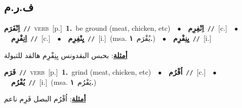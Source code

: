\documentclass[10pt,a4paper,twoside]{article} %
\begin{document}
\begin{multicols}{2}
\vspace{-3mm}
\subsection*{\color{blue}\foreignlanguage{arabic}{ف.ر.م}\color{blue}{}} 

{\setlength\topsep{0pt}\textbf{\foreignlanguage{arabic}{اِنْفَرَم}}\ {\color{gray}\texttt{//}\color{black}}\ \textsc{verb}\ [p.]\ \textbf{1.}~be ground (meat, chicken, etc)\ \ $\bullet$\ \ \setlength\topsep{0pt}\textbf{\foreignlanguage{arabic}{اِنْفِرِم}}\ {\color{gray}\texttt{//}\color{black}}\ [c.]\ \ $\bullet$\ \ \setlength\topsep{0pt}\textbf{\foreignlanguage{arabic}{اِنِفْرِم}}\ {\color{gray}\texttt{//}\color{black}}\ [c.]\ \ $\bullet$\ \ \setlength\topsep{0pt}\textbf{\foreignlanguage{arabic}{يِنْفِرِم}}\ {\color{gray}\texttt{//}\color{black}}\ [i.]\ \color{gray}(msa. \foreignlanguage{arabic}{يُفْرَم}~\foreignlanguage{arabic}{\textbf{١.}})\color{black}\ \ $\bullet$\ \ \setlength\topsep{0pt}\textbf{\foreignlanguage{arabic}{يِنِفْرِم}}\ {\color{gray}\texttt{//}\color{black}}\ [i.]\  \begin{flushright}\color{gray}\foreignlanguage{arabic}{\textbf{\underline{\foreignlanguage{arabic}{أمثلة}}}: بحبس البقدونس يِنِفْرِم هالقد للتبولة}\end{flushright}\color{black}} \vspace{2mm}

{\setlength\topsep{0pt}\textbf{\foreignlanguage{arabic}{فَرَم}}\ {\color{gray}\texttt{//}\color{black}}\ \textsc{verb}\ [p.]\ \textbf{1.}~grind (meat, chicken, etc)\ \ $\bullet$\ \ \setlength\topsep{0pt}\textbf{\foreignlanguage{arabic}{اُفْرُم}}\ {\color{gray}\texttt{//}\color{black}}\ [c.]\ \ $\bullet$\ \ \setlength\topsep{0pt}\textbf{\foreignlanguage{arabic}{يُفْرُم}}\ {\color{gray}\texttt{//}\color{black}}\ [i.]\ \color{gray}(msa. \foreignlanguage{arabic}{يَفْرُم}~\foreignlanguage{arabic}{\textbf{١.}})\color{black}\  \begin{flushright}\color{gray}\foreignlanguage{arabic}{\textbf{\underline{\foreignlanguage{arabic}{أمثلة}}}: اُفْرُم البصل فَرِم ناعم}\end{flushright}\color{black}} \vspace{2mm}


\end{multicols}
\end{document}
